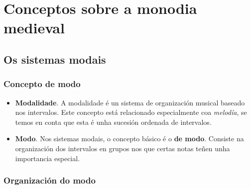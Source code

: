 \documentclass[spanish, a4paper,nobind]{templates/ociamthesis}
\begin{document}
\setlength{\textbaselineskip}{16pt plus2pt minus1pt} %
\setlength{\parskip}{2pt plus 1pt}

\setlength{\baselineskip}{\textbaselineskip}

\hypertarget{conceptos-sobre-a-monodia-medieval}{%
\chapter*{Conceptos sobre a monodia medieval}\label{conceptos-sobre-a-monodia-medieval}}

\minitoc

\hypertarget{os-sistemas-modais}{%
\section*{Os sistemas modais}\label{os-sistemas-modais}}

\hypertarget{concepto-de-modo}{%
\subsection*{Concepto de modo}\label{concepto-de-modo}}

\begin{itemize}
\item
  \textbf{Modalidade}. A modalidade é un sistema de organización musical baseado nos intervalos. Este concepto está relacionado especialmente coa \emph{melodía}, se temos en conta que esta é unha sucesión ordenada de intervalos.
\item
  \textbf{Modo}. Nos sistemas modais, o concepto básico é o \textbf{de modo}. Consiste na organización dos intervalos en grupos nos que certas notas teñen unha importancia especial.
\end{itemize}

\hypertarget{organizaciuxf3n-do-modo}{%
\subsection*{Organización do modo}\label{organizaciuxf3n-do-modo}}
\end{document}
